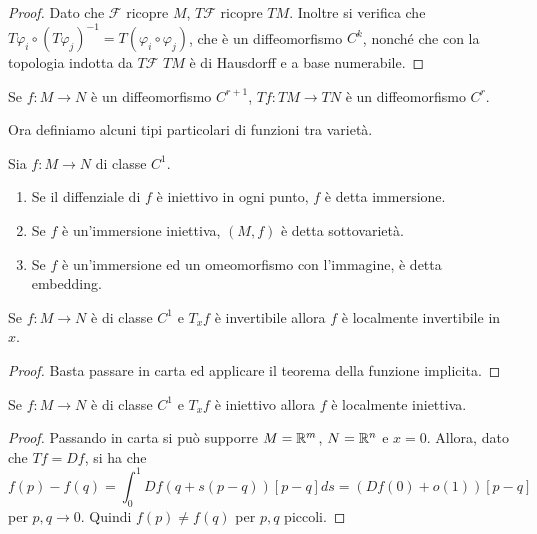  \begin{proof}
  Dato che $\mathcal F$ ricopre $M$, $T\mathcal F$ ricopre $TM$. Inoltre si verifica che $T\varphi_i\circ(T\varphi_j)^{-1}=T(\varphi_i\circ\varphi_j)$,
  che è un diffeomorfismo $C^k$, nonché che con la topologia indotta da $T\mathcal F$
  $TM$ è di Hausdorff e a base numerabile.
 \end{proof}

 \begin{proposition}
  Se $f:M\to N$ è un diffeomorfismo $C^{r+1}$, $Tf:TM\to TN$ è un diffeomorfismo $C^r$.
 \end{proposition}

 Ora definiamo alcuni tipi particolari di funzioni tra varietà.
 
 \begin{definition}
  Sia $f:M\to N$ di classe $C^1$.
  \begin{enumerate}[label=\bf\Roman*)]
   \item Se il diffenziale di $f$ è iniettivo in ogni punto, $f$ è detta immersione.
   \item Se $f$ è un'immersione iniettiva, $(M,f)$ è detta sottovarietà.
   \item Se $f$ è un'immersione ed un omeomorfismo con l'immagine, è detta embedding.
  \end{enumerate}
 \end{definition}

 \begin{proposition}
  Se $f:M\to N$ è di classe $C^1$ e $T_xf$ è invertibile allora $f$ è localmente invertibile in $x$.
 \end{proposition}

 \begin{proof}
  Basta passare in carta ed applicare il teorema della funzione implicita.
 \end{proof}

 \begin{proposition}
  Se $f:M\to N$ è di classe $C^1$ e $T_xf$ è iniettivo allora $f$ è localmente iniettiva.
 \end{proposition}

 \begin{proof}
  Passando in carta si può supporre $M=\mathbb R^m$, $N=\mathbb R^n$ e $x=0$. Allora, dato
  che $Tf=Df$, si ha che
  $$f(p)-f(q)=\int_0^1Df(q+s(p-q))[p-q]ds=(Df(0)+o(1))[p-q]$$
  per $p,q\to 0$. Quindi $f(p)\ne f(q)$ per $p,q$ piccoli.
 \end{proof}

